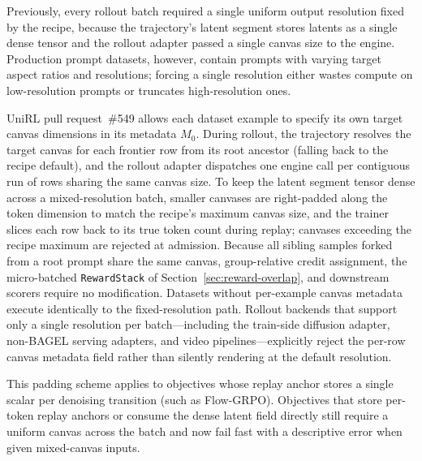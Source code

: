 Previously, every rollout batch required a single uniform output resolution fixed by the recipe, because the trajectory's latent segment stores latents as a single dense tensor and the rollout adapter passed a single canvas size to the engine.
Production prompt datasets, however, contain prompts with varying target aspect ratios and resolutions; forcing a single resolution either wastes compute on low-resolution prompts or truncates high-resolution ones.

UniRL pull request~\#549 allows each dataset example to specify its own target canvas dimensions in its metadata $M_0$.
During rollout, the trajectory resolves the target canvas for each frontier row from its root ancestor (falling back to the recipe default), and the rollout adapter dispatches one engine call per contiguous run of rows sharing the same canvas size.
To keep the latent segment tensor dense across a mixed-resolution batch, smaller canvases are right-padded along the token dimension to match the recipe's maximum canvas size, and the trainer slices each row back to its true token count during replay; canvases exceeding the recipe maximum are rejected at admission.
Because all sibling samples forked from a root prompt share the same canvas, group-relative credit assignment, the micro-batched \texttt{RewardStack} of Section~\ref{sec:reward-overlap}, and downstream scorers require no modification.
Datasets without per-example canvas metadata execute identically to the fixed-resolution path.
Rollout backends that support only a single resolution per batch---including the train-side diffusion adapter, non-BAGEL serving adapters, and video pipelines---explicitly reject the per-row canvas metadata field rather than silently rendering at the default resolution.

This padding scheme applies to objectives whose replay anchor stores a single scalar per denoising transition (such as Flow-GRPO).
Objectives that store per-token replay anchors or consume the dense latent field directly still require a uniform canvas across the batch and now fail fast with a descriptive error when given mixed-canvas inputs.

\begin{table}[H]
\caption{Generation time (seconds) for one prompt group of four sibling samples across three output canvas resolutions on a single H20 rank, for image-to-image editing (\texttt{it2i}, which additionally encodes a $512\times512$ source image) and text-to-image generation (\texttt{t2i}). The $768\times768$ \texttt{t2i} entry was measured on an earlier commit of the same branch.}
\label{tab:fidelity-canvas}
\centering
\small

\end{table}

